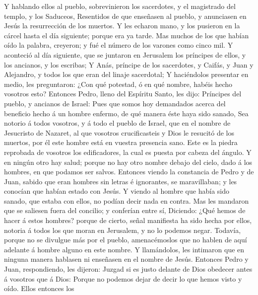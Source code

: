  Y hablando ellos al pueblo, sobrevinieron los sacerdotes,
y el magistrado del templo, y los Saduceos,  Resentidos de
que enseñasen al pueblo, y anunciasen en Jesús la resurrección de los
muertos.  Y les echaron mano, y los pusieron en la cárcel
hasta el día siguiente; porque era ya tarde.  Mas muchos
de los que habían oído la palabra, creyeron; y fué el número de los
varones como cinco mil.  Y aconteció al día siguiente, que
se juntaron en Jerusalem los príncipes de ellos, y los ancianos, y los
escribas;  Y Anás, príncipe de los sacerdotes, y Caifás, y
Juan y Alejandro, y todos los que eran del linaje sacerdotal;
 Y haciéndolos presentar en medio, les preguntaron: ¿Con
qué potestad, ó en qué nombre, habéis hecho vosotros esto?
 Entonces Pedro, lleno del Espíritu Santo, les dijo:
Príncipes del pueblo, y ancianos de Israel:  Pues que
somos hoy demandados acerca del beneficio hecho á un hombre enfermo, de
qué manera éste haya sido sanado,  Sea notorio á todos
vosotros, y á todo el pueblo de Israel, que en el nombre de Jesucristo
de Nazaret, al que vosotros crucificasteis y Dios le resucitó de los
muertos, por él este hombre está en vuestra presencia sano.
 Este es la piedra reprobada de vosotros los
edificadores, la cual es puesta por cabeza del ángulo.  Y
en ningún otro hay salud; porque no hay otro nombre debajo del cielo,
dado á los hombres, en que podamos ser salvos.  Entonces
viendo la constancia de Pedro y de Juan, sabido que eran hombres sin
letras é ignorantes, se maravillaban; y les conocían que habían estado
con Jesús.  Y viendo al hombre que había sido sanado, que
estaba con ellos, no podían decir nada en contra.  Mas
les mandaron que se saliesen fuera del concilio; y conferían entre sí,
 Diciendo: ¿Qué hemos de hacer á estos hombres? porque de
cierto, señal manifiesta ha sido hecha por ellos, notoria á todos los
que moran en Jerusalem, y no lo podemos negar.  Todavía,
porque no se divulgue más por el pueblo, amenacémoslos que no hablen de
aquí adelante á hombre alguno en este nombre.  Y
llamándolos, les intimaron que en ninguna manera hablasen ni enseñasen
en el nombre de Jesús.  Entonces Pedro y Juan,
respondiendo, les dijeron: Juzgad si es justo delante de Dios obedecer
antes á vosotros que á Dios:  Porque no podemos dejar de
decir lo que hemos visto y oído.  Ellos entonces los
